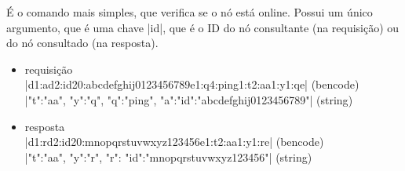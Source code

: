 
{}

É o comando mais simples, que verifica se o nó está online. Possui um único argumento,
que é uma chave \bverb|id|, que é o ID do nó consultante (na requisição) ou do nó
consultado (na resposta).

\begin{itemize}
    \item requisição \\
        \bverb|d1:ad2:id20:abcdefghij0123456789e1:q4:ping1:t2:aa1:y1:qe|
        (\gls*{bencode}) \\
        \sverb|{"t":"aa", "y":"q", "q":"ping", "a":{"id":"abcdefghij0123456789"}}|
        (\gls*{string})

    \item resposta \\
        \bverb|d1:rd2:id20:mnopqrstuvwxyz123456e1:t2:aa1:y1:re|
        (\gls*{bencode}) \\
        \sverb|{"t":"aa", "y":"r", "r": {"id":"mnopqrstuvwxyz123456"}}|
        (\gls*{string})
\end{itemize}

